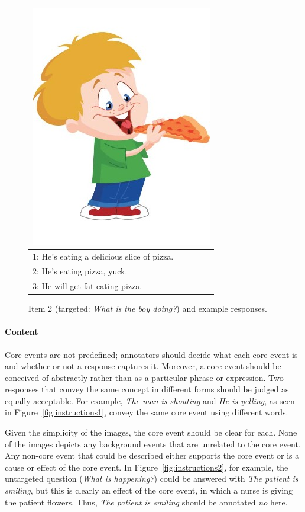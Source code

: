 \documentclass[12pt]{article}
\begin{document}
\begin{figure}[htb!]
\begin{center}
\begin{tabular}{|l|}
\hline
\includegraphics[width=0.4\columnwidth,trim=0 0 0 -3]{figures/I02.jpg}\\
\hline
1: He's eating a delicious slice of pizza. \\
\hline
2: He's eating pizza, yuck. \\
\hline
3: He will get fat eating pizza. \\
\hline
\end{tabular}
\end{center}
\caption{Item 2 (targeted: \textit{What is the boy doing?}) and example responses.}
\label{fig:eat-pizza}
\end{figure}

\paragraph{Content}
Core events are not predefined; annotators should decide what each core event is and whether or not a response captures it. Moreover, a core event should be conceived of abstractly rather than as a particular phrase or expression. Two responses that convey the same concept in different forms should be judged as equally acceptable. For example, \textit{The man is shouting} and \textit{He is yelling}, as seen in Figure~\ref{fig:instructions1}, convey the same core event using different words.

Given the simplicity of the images, the core event should be clear for each. None of the images depicts any background events that are unrelated to the core event. Any non-core event that could be described either supports the core event or is a cause or effect of the core event. In Figure~\ref{fig:instructions2}, for example, the untargeted question (\textit{What is happening?}) could be answered with \textit{The patient is smiling}, but this is clearly an effect of the core event, in which a nurse is giving the patient flowers. Thus, \textit{The patient is smiling} should be annotated \textit{no} here.
\end{document}
